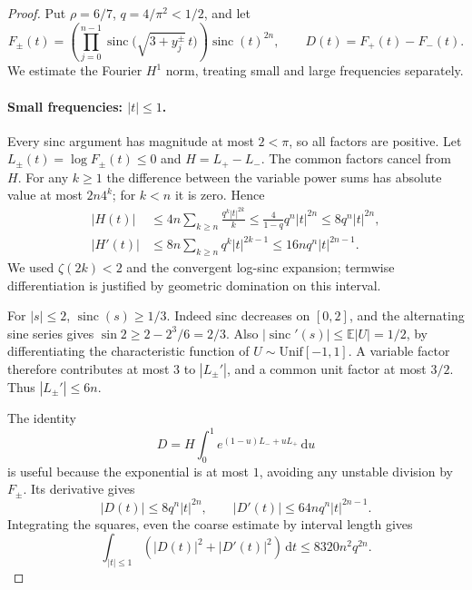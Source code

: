 \documentclass[11pt,a4paper]{article}
\theoremstyle{definition}
\theoremstyle{remark}
\DeclareMathOperator{\sinc}{sinc}
\newcommand{\E}{\mathbb E}
\newcommand{\dd}{\,\mathrm d}
\begin{document}
\begin{proof}
Put $\rho=6/7$, $q=4/\pi^2<1/2$, and let
\[
 F_\pm(t)=\left(\prod_{j=0}^{n-1}
       \sinc\bigl(\sqrt{3+y_j^\pm}\,t\bigr)\right)\sinc(t)^{2n},
 \qquad D(t)=F_+(t)-F_-(t).
\]
We estimate the Fourier $H^1$ norm, treating small and large frequencies
separately.

\paragraph{Small frequencies: $|t|\le1$.}
Every sinc argument has magnitude at most $2<\pi$, so all factors are
positive. Let $L_\pm(t)=\log F_\pm(t)\le0$ and
$H=L_+-L_-$. The common factors cancel from $H$.
For any $k\ge1$ the difference between the variable power sums has
absolute value at most $2n4^k$; for $k<n$ it is zero. Hence
\begin{align*}
 |H(t)|
 &\le4n\sum_{k\ge n}\frac{q^k|t|^{2k}}{k}
 \le\frac4{1-q}q^n|t|^{2n}
 \le8q^n|t|^{2n},\\
 |H'(t)|
 &\le8n\sum_{k\ge n}q^k|t|^{2k-1}
 \le16nq^n|t|^{2n-1}.
\end{align*}
We used $\zeta(2k)<2$ and the convergent log-sinc expansion; termwise
differentiation is justified by geometric domination on this interval.

For $|s|\le2$, $\sinc(s)\ge1/3$. Indeed sinc decreases on $[0,2]$,
and the alternating sine series gives $\sin2\ge2-2^3/6=2/3$.
Also $|\sinc'(s)|\le\E|U|=1/2$, by differentiating the characteristic
function of $U\sim\mathrm{Unif}[-1,1]$. A variable factor therefore
contributes at most $3$ to $|L_\pm'|$, and a common unit factor at most
$3/2$. Thus $|L_\pm'|\le6n$.

The identity
\[
 D=H\int_0^1 e^{(1-u)L_-+uL_+}\dd u
\]
is useful because the exponential is at most $1$, avoiding any unstable
division by $F_\pm$. Its derivative gives
\begin{equation}\label{eq:low-bounds}
 |D(t)|\le8q^n|t|^{2n},\qquad
 |D'(t)|\le64nq^n|t|^{2n-1}.
\end{equation}
Integrating the squares, even the coarse estimate by interval length gives
\begin{equation}\label{eq:low-int}
 \int_{|t|\le1}(|D(t)|^2+|D'(t)|^2)\dd t
       \le8320n^2q^{2n}.
\end{equation}


\end{proof}
\end{document}
